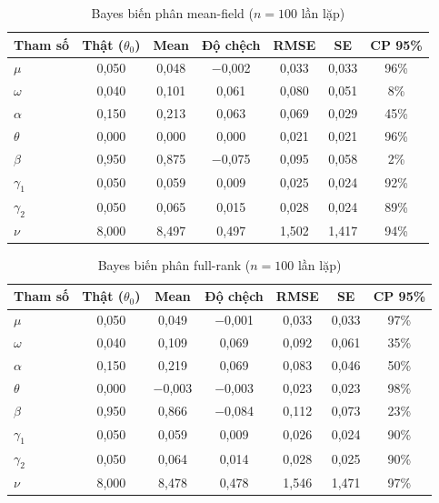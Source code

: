 \documentclass[11pt,a4paper]{article}
\begin{document}
\begin{table}[H]\centering\footnotesize
\caption{Bayes biến phân mean-field ($n=100$ lần lặp)}
\begin{tabularx}{\textwidth}{l C C C C C C}
\toprule
\textbf{Tham số} & \textbf{Thật ($\theta_0$)} & \textbf{Mean} & \textbf{Độ chệch} & \textbf{RMSE} & \textbf{SE} & \textbf{CP 95\%} \\
\midrule
$\mu$ & 0,050 & 0,048 & $-$0,002 & 0,033 & 0,033 & 96\% \\
$\omega$ & 0,040 & 0,101 & 0,061 & 0,080 & 0,051 & 8\% \\
$\alpha$ & 0,150 & 0,213 & 0,063 & 0,069 & 0,029 & 45\% \\
$\theta$ & 0,000 & 0,000 & 0,000 & 0,021 & 0,021 & 96\% \\
$\beta$ & 0,950 & 0,875 & $-$0,075 & 0,095 & 0,058 & 2\% \\
$\gamma_1$ & 0,050 & 0,059 & 0,009 & 0,025 & 0,024 & 92\% \\
$\gamma_2$ & 0,050 & 0,065 & 0,015 & 0,028 & 0,024 & 89\% \\
$\nu$ & 8,000 & 8,497 & 0,497 & 1,502 & 1,417 & 94\% \\
\bottomrule
\end{tabularx}
\end{table}

\begin{table}[H]\centering\footnotesize
\caption{Bayes biến phân full-rank ($n=100$ lần lặp)}
\begin{tabularx}{\textwidth}{l C C C C C C}
\toprule
\textbf{Tham số} & \textbf{Thật ($\theta_0$)} & \textbf{Mean} & \textbf{Độ chệch} & \textbf{RMSE} & \textbf{SE} & \textbf{CP 95\%} \\
\midrule
$\mu$ & 0,050 & 0,049 & $-$0,001 & 0,033 & 0,033 & 97\% \\
$\omega$ & 0,040 & 0,109 & 0,069 & 0,092 & 0,061 & 35\% \\
$\alpha$ & 0,150 & 0,219 & 0,069 & 0,083 & 0,046 & 50\% \\
$\theta$ & 0,000 & $-$0,003 & $-$0,003 & 0,023 & 0,023 & 98\% \\
$\beta$ & 0,950 & 0,866 & $-$0,084 & 0,112 & 0,073 & 23\% \\
$\gamma_1$ & 0,050 & 0,059 & 0,009 & 0,026 & 0,024 & 90\% \\
$\gamma_2$ & 0,050 & 0,064 & 0,014 & 0,028 & 0,025 & 90\% \\
$\nu$ & 8,000 & 8,478 & 0,478 & 1,546 & 1,471 & 97\% \\
\bottomrule
\end{tabularx}
\end{table}
\end{document}
